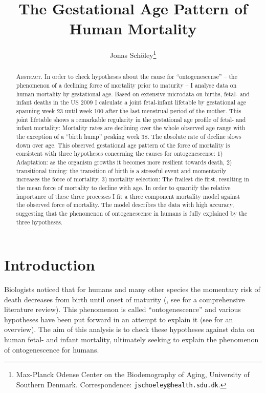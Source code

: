 \documentclass[
  12pt
]{scrartcl}
\title{The Gestational Age Pattern of Human Mortality}
\author{Jonas Schöley\footnote{Max-Planck Odense Center on the Biodemography of Aging, University of Southern Denmark. Correspondence: \texttt{jschoeley@health.sdu.dk}.}}
\begin{document}
\maketitle

\thispagestyle{empty}

\begin{abstract}
\textsc{Abstract.} In order to check hypotheses about the cause for \enquote{ontogenescense} -- the phenomenon of a declining force of mortality prior to maturity -- I analyse data on human mortality by gestational age. Based on extensive microdata on births, fetal- and infant deaths in the US 2009 I calculate a joint fetal-infant lifetable by gestational age spanning week 23 until week 100 after the last menstrual period of the mother. This joint lifetable shows a remarkable regularity in the gestational age profile of fetal- and infant mortality: Mortality rates are declining over the whole observed age range with the exception of a \enquote{birth hump} peaking week 38. The absolute rate of decline slows down over age. This observed gestational age pattern of the force of mortality is consistent with three hypotheses concerning the causes for ontogenescense: 1) Adaptation: as the organism growths it becomes more resilient towards death, 2) transitional timing: the transition of birth is a stressful event and momentarily increases the force of mortality, 3) mortality selection: The frailest die first, resulting in the mean force of mortality to decline with age. In order to quantify the relative importance of these three processes I fit a three component mortality model against the observed force of mortality. The model describes the data with high accuracy, suggesting that the phenomenon of ontogenescense in humans is fully explained by the three hypotheses.
\end{abstract}

\clearpage


\section{Introduction} %
\label{sec:introduction}

Biologists noticed that for humans and many other species the momentary risk of death decreases from birth until onset of maturity (\cite{Medawar1952}, see \cite{Levitis2011} for a comprehensive literature review). This phenomenon is called \enquote{ontogenescence} and various hypotheses have been put forward in an attempt to explain it (see \cite{Levitis2011} for an overview). The aim of this analysis is to check these hypotheses against data on human fetal- and infant mortality, ultimately seeking to explain the phenomenon of ontogenescence for humans.
\end{document}
